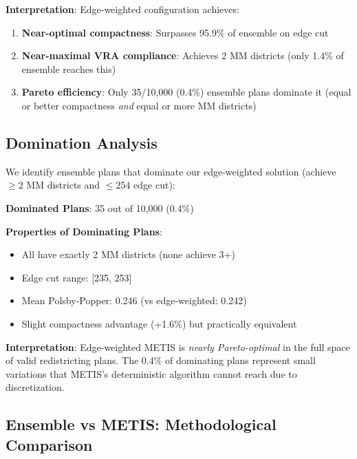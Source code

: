 \textbf{Interpretation}: Edge-weighted configuration achieves:
\begin{enumerate}
    \item \textbf{Near-optimal compactness}: Surpasses 95.9\% of ensemble on edge cut
    \item \textbf{Near-maximal VRA compliance}: Achieves 2 MM districts (only 1.4\% of ensemble reaches this)
    \item \textbf{Pareto efficiency}: Only 35/10,000 (0.4\%) ensemble plans dominate it (equal or better compactness \textit{and} equal or more MM districts)
\end{enumerate}

\subsection{Domination Analysis}

We identify ensemble plans that dominate our edge-weighted solution (achieve $\geq 2$ MM districts and $\leq 254$ edge cut):

\textbf{Dominated Plans}: 35 out of 10,000 (0.4\%)

\textbf{Properties of Dominating Plans}:
\begin{itemize}
    \item All have exactly 2 MM districts (none achieve 3+)
    \item Edge cut range: [235, 253]
    \item Mean Polsby-Popper: 0.246 (vs edge-weighted: 0.242)
    \item Slight compactness advantage (+1.6\%) but practically equivalent
\end{itemize}

\textbf{Interpretation}: Edge-weighted METIS is \textit{nearly Pareto-optimal} in the full space of valid redistricting plans. The 0.4\% of dominating plans represent small variations that METIS's deterministic algorithm cannot reach due to discretization.

\subsection{Ensemble vs METIS: Methodological Comparison}

